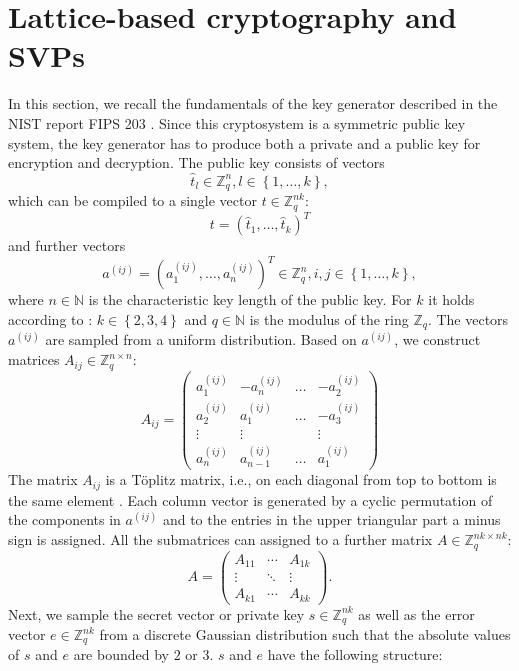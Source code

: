 \section{Lattice-based cryptography and SVPs}
\label{sec:SVPs}

In this section, we recall the fundamentals of the key generator described in the NIST report FIPS 203 \cite{NIST203}. Since this cryptosystem is a symmetric public key system, the key generator has to produce both a private and a public key for encryption and decryption. The public key consists of vectors 
$$
\hat{t}_l \in \mathbb{Z}_q^n, l \in \left\{1,\ldots,k\right\},
$$
which can be compiled to a single vector $t \in \mathbb{Z}_q^{nk}$:
$$
t = \left( \hat{t}_1,\ldots, \hat{t}_k \right)^T
$$
and further vectors
$$
a^{(ij)} = \left(a_1^{(ij)},\ldots,a_n^{(ij)} \right)^T \in \mathbb{Z}_q^{n}, i,j \in \left\{1,\ldots,k\right\},
$$
where $n \in \mathbb{N}$ is the characteristic key length of the public key. For $k$ it holds according to \cite{NIST203}: $k \in \left\{2,3,4\right\}$ and $q \in \mathbb{N}$ is the modulus of the ring $\mathbb{Z}_q$. The vectors $a^{(ij)}$ are sampled from a uniform distribution. Based on $a^{(ij)}$, we construct matrices $A_{ij} \in \mathbb{Z}_q^{n \times n}$:
$$
A_{ij} = 
\begin{pmatrix} a_1^{(ij)} & -a_{n}^{(ij)} & \ldots & -a_2^{(ij)} \\ 
                a_2^{(ij)} &  a_1^{(ij)}     & \ldots & -a_3^{(ij)} \\
                \vdots     &  \vdots         &   & \vdots \\
                a_{n}^{(ij)} & a_{n-1}^{(ij)}  & \ldots & a_{1}^{(ij)}
\end{pmatrix}
$$
The matrix $A_{ij}$ is a T\"oplitz matrix, i.e., on each diagonal from top to bottom is the same element \cite{Gray06}. Each column vector is generated by a cyclic permutation of the components in $a^{(ij)}$ and to the entries in the upper triangular part a minus sign is assigned. All the submatrices can assigned to a further matrix $A \in \mathbb{Z}_q^{nk \times nk}$:
$$
A= \begin{pmatrix} A_{11} & \cdots & A_{1k} \\ \vdots & \ddots &  \vdots \\  A_{k1} & \cdots & A_{kk}\end{pmatrix}.
$$
Next, we sample the secret vector or private key $s \in \mathbb{Z}_q^{nk}$ as well as the error vector $e \in \mathbb{Z}_q^{nk}$ from a discrete Gaussian distribution such that the absolute values of $s$ and $e$ are bounded by $2$ or $3$. $s$ and $e$ have the following structure:
